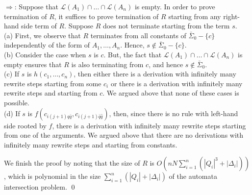\documentclass{LMCS}
\theoremstyle{plain}
\begin{document}
$\Rightarrow$: Suppose that 
${\mathcal L}(A_1)\cap\ldots\cap{\mathcal L}(A_n)$ is empty.
In order to prove termination of $R$,
it suffices to prove termination of $R$ starting from any 
right-hand side term of $R$.
Suppose $R$ does not terminate starting from the term $s$.
\\
(a) First, we observe that $R$ terminates from
all constants of $\bar{\Sigma}_0-\{c\}$ independently of
the form of $A_1,\ldots,A_n$. 
Hence, $s\not\in\bar{\Sigma}_0-\{c\}$.
\\
(b) Consider the case when $s$ is $c$.
But, the fact that ${\mathcal L}(A_1)\cap\ldots\cap{\mathcal L}(A_n)$
is empty ensures that $R$ is also terminating from $c$, and hence
$s\not\in\bar{\Sigma}_0$.
\\
(c)
If $s$ is $h(c_1,\ldots,c_n)$, then either there is a derivation
with infinitely many rewrite steps
starting from some $c_i$ or there is a derivation 
with infinitely many rewrite steps and starting
from $c$.  We argued above that none of these cases is possible.
\\
(d)
If $s$ is $f(c_{i(j+1)q\bar{q}},c_{i(j+1)\bar{q}\hat{q}})$,
then, since there is no rule with left-hand side rooted by $f$,
there is a derivation with infinitely many rewrite
steps starting from one of the arguments.
We argued above that there are no derivations
with infinitely many rewrite steps and starting from
constants.

We finish the proof by noting that the size of $R$ is 
$O(nN\sum_{i=1}^{n}(|Q_i|^3+|\Delta_i|))$,
which is polynomial in the size $\sum_{i=1}^n(|Q_i|+|\Delta_i|)$
of the automata intersection problem.
\qed
\end{document}
